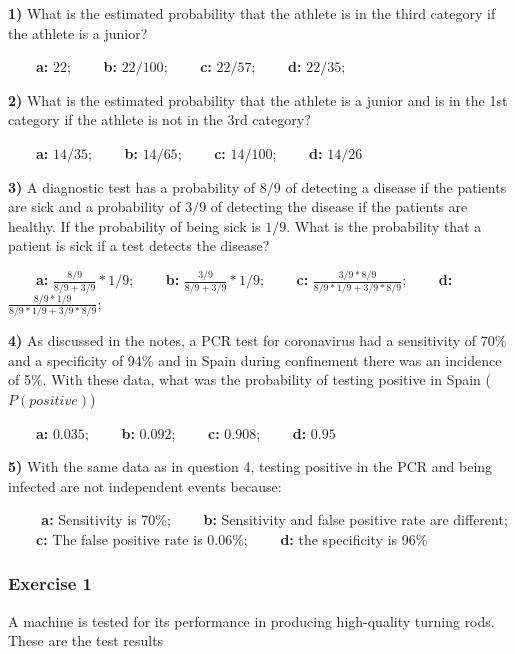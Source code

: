 \documentclass[
]{book}
\begin{document}
\textbf{1)} What is the estimated probability that the athlete is in the third category if the athlete is a junior?

\textbf{\(\qquad\)a:} \(22\); \textbf{\(\qquad\)b:} \(22/100\); \textbf{\(\qquad\)c:} \(22/57\); \textbf{\(\qquad\)d:} \(22/35\);

\textbf{2)} What is the estimated probability that the athlete is a junior and is in the 1st category if the athlete is not in the 3rd category?

\textbf{\(\qquad\)a:} \(14/35\); \textbf{\(\qquad\)b:} \(14/65\); \textbf{\(\qquad\)c:} \(14/100\); \textbf{\(\qquad\)d:} \(14/26\)

\textbf{3)} A diagnostic test has a probability of \(8/9\) of detecting a disease if the patients are sick and a probability of \(3/9\) of detecting the disease if the patients are healthy. If the probability of being sick is \(1/9\). What is the probability that a patient is sick if a test detects the disease?

\textbf{\(\qquad\)a:} \(\frac{8/9}{8/9+3/9}*1/9\);
\textbf{\(\qquad\)b:} \(\frac{3/9}{8/9+3/9}*1/9\);
\textbf{\(\qquad\)c:} \(\frac{3/9*8/9}{8/9*1/9+3/9*8/9}\); \textbf{\(\qquad\)d:} \(\frac{8/9*1/9}{8/9*1/9+3/9*8/9}\);

\textbf{4)} As discussed in the notes, a PCR test for coronavirus had a sensitivity of 70\% and a specificity of 94\% and in Spain during confinement there was an incidence of 5\%. With these data, what was the probability of testing positive in Spain (\(P(positive)\))

\textbf{\(\qquad\)a:} \(0.035\); \textbf{\(\qquad\)b:} \(0.092\); \textbf{\(\qquad\)c:} \(0.908\); \textbf{\(\qquad\)d:} \(0.95\)

\textbf{5)} With the same data as in question 4, testing positive in the PCR and being infected are not independent events because:

\textbf{\(\qquad\) a:} Sensitivity is 70\%;
\textbf{\(\qquad\)b:} Sensitivity and false positive rate are different;
\textbf{\(\qquad\)c:} The false positive rate is 0.06\%; \textbf{\(\qquad\)d:} the specificity is 96\%

\hypertarget{exercise-1-1}{%
\subsubsection{Exercise 1}\label{exercise-1-1}}

A machine is tested for its performance in producing high-quality turning rods. These are the test results
\end{document}
